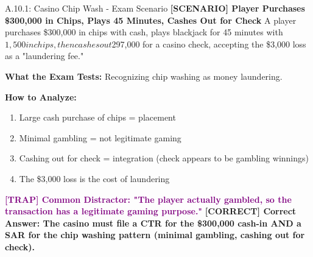 \documentclass[11pt,a4paper]{beamer}
\newcommand{\trap}[1]{\textcolor{purple}{\textbf{[TRAP] #1}}}
\newcommand{\correct}[1]{\textcolor{green!50!black}{\textbf{[CORRECT] #1}}}
\newcommand{\scenario}[1]{\textcolor{blue!70!black}{\textbf{[SCENARIO] #1}}}
\begin{document}
	\begin{frame}{A.10.1: Casino Chip Wash - Exam Scenario}
		\scenario{Player Purchases \$300,000 in Chips, Plays 45 Minutes, Cashes Out for Check}
		A player purchases \$300,000 in chips with cash, plays blackjack for 45 minutes with $1,500 in chips, then cashes out $297,000 for a casino check, accepting the \$3,000 loss as a "laundering fee."
		
		\vspace{0.1cm}
		\textbf{What the Exam Tests:} Recognizing chip washing as money laundering.
		
		\vspace{0.1cm}
		\textbf{How to Analyze:}
		\begin{enumerate}
			\item Large cash purchase of chips = placement
			\item Minimal gambling = not legitimate gaming
			\item Cashing out for check = integration (check appears to be gambling winnings)
			\item The \$3,000 loss is the cost of laundering
		\end{enumerate}
		
		\trap{Common Distractor: "The player actually gambled, so the transaction has a legitimate gaming purpose."}
		\correct{Correct Answer: The casino must file a CTR for the \$300,000 cash-in AND a SAR for the chip washing pattern (minimal gambling, cashing out for check).}
	\end{frame}
	
	
\end{document}
